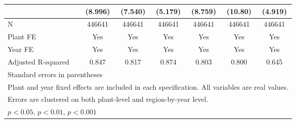 \begin{table}[htbp]
\begin{tabular}{l*{6}{c}}
                &  (8.996)         &  (7.540)         &  (5.179)         &  (8.759)         &  (10.80)         &  (4.919)         \\
\midrule
N               &   446641         &   446641         &   446641         &   446641         &   446641         &   446641         \\
Plant FE        &      Yes         &      Yes         &      Yes         &      Yes         &      Yes         &      Yes         \\
Year FE         &      Yes         &      Yes         &      Yes         &      Yes         &      Yes         &      Yes         \\
Adjusted R-squared&    0.847         &    0.817         &    0.874         &    0.803         &    0.800         &    0.645         \\
\bottomrule
\multicolumn{7}{l}{\footnotesize Standard errors in parentheses}\\
\multicolumn{7}{l}{\footnotesize Plant and year fixed effects are included in each specification. All variables are real values.}\\
\multicolumn{7}{l}{\footnotesize Errors are clustered on both plant-level and region-by-year level. }\\
\multicolumn{7}{l}{\footnotesize \sym{*} \(p<0.05\), \sym{**} \(p<0.01\), \sym{***} \(p<0.001\)}\\
\end{tabular}
\end{table}
